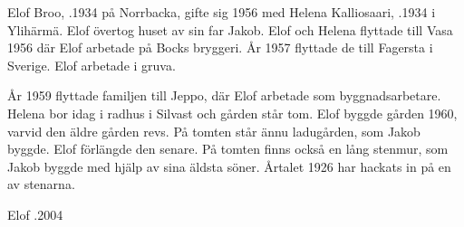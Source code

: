 


Elof Broo, .1934 på Norrbacka, gifte sig 1956 med Helena Kalliosaari, .1934 i Ylihärmä. Elof övertog huset av sin far Jakob. Elof och Helena flyttade till Vasa 1956 där Elof arbetade på Bocks bryggeri. År 1957 flyttade de till Fagersta i Sverige. Elof arbetade i gruva.
\begin{jhchildren}
  \item {}
  \item {}
  \item {}
  \item {}
\end{jhchildren}

År 1959 flyttade familjen till Jeppo, där Elof arbetade som byggnadsarbetare. Helena bor idag i radhus i Silvast och gården står tom. Elof byggde gården 1960, varvid den äldre gården revs. På tomten står ännu ladugården, som Jakob byggde. Elof förlängde den senare. På tomten finns också en lång stenmur, som Jakob byggde med hjälp av sina äldsta söner. Årtalet 1926 har hackats in på en av stenarna.

Elof .2004





